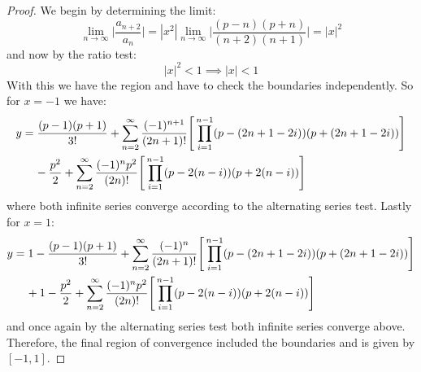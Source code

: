 \documentclass[12pt, letterpaper, onecolumn, conference, final]{IEEEtran}
\theoremstyle{definition}
\theoremstyle{plain}
\begin{document}
\begin{proof}
We begin by determining the limit:
\begin{equation*}
\lim_{n \rightarrow \infty} \Big| \frac{a_{n + 2}}{a_n} \Big| = |x^2| \lim_{n \rightarrow \infty} \Bigg| \frac{(p - n)(p + n)}{(n + 2)(n + 1)} \Bigg| = |x|^2
\end{equation*}
and now by the ratio test:
\begin{equation*}
|x|^2 < 1 \implies |x| < 1
\end{equation*}
With this we have the region and have to check the boundaries independently. So for $x = -1$ we have:
\begin{equation*}
\begin{split}
y &= \frac{(p - 1)(p + 1)}{3!} + \sum_{n = 2}^\infty \frac{(-1)^{n + 1}}{(2n + 1)!} \Bigg[ \prod_{i = 1}^{n - 1} (p - (2n + 1 - 2i))(p + (2n + 1 - 2i)) \Bigg] \\
&\hspace{.4cm} - \frac{p^2}{2} + \sum_{n = 2}^\infty \frac{(-1)^np^2}{(2n)!} \Bigg[ \prod_{i = 1}^{n - 1} (p - 2(n - i))(p + 2(n - i)) \Bigg]
\end{split}
\end{equation*}
where both infinite series converge according to the alternating series test. Lastly for $x = 1$:
\begin{equation*}
\begin{split}
y &= 1 - \frac{(p - 1)(p + 1)}{3!} + \sum_{n = 2}^\infty \frac{(-1)^n}{(2n + 1)!} \Bigg[ \prod_{i = 1}^{n - 1} (p - (2n + 1 - 2i))(p + (2n + 1 - 2i)) \Bigg] \\
&\hspace{.4cm} + 1 - \frac{p^2}{2} + \sum_{n = 2}^\infty \frac{(-1)^np^2}{(2n)!} \Bigg[ \prod_{i = 1}^{n - 1} (p - 2(n - i))(p + 2(n - i)) \Bigg]
\end{split}
\end{equation*}
and once again by the alternating series test both infinite series converge above. Therefore, the final region of convergence included the boundaries and is given by $[-1,1]$.
\end{proof}
\end{document}
